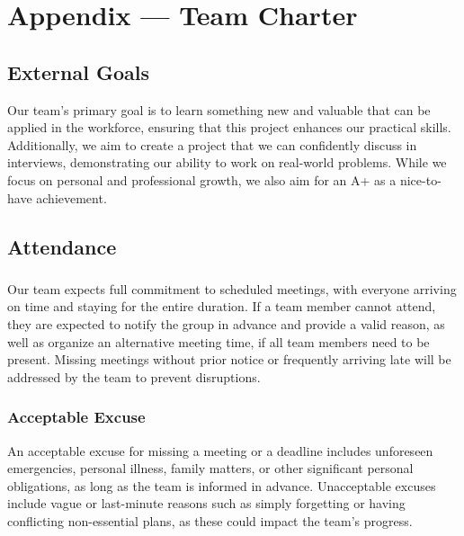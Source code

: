 \documentclass{article}
\begin{document}
\newpage{}

\section*{Appendix --- Team Charter}

\subsection*{External Goals}

Our team's primary goal is to learn something new and valuable that can be applied in the workforce, 
ensuring that this project enhances our practical skills. Additionally, we aim to create a project 
that we can confidently discuss in interviews, demonstrating our ability to work on real-world 
problems. While we focus on personal and professional growth, we also aim for an A+ as a 
nice-to-have achievement.

\subsection*{Attendance}

\subsubsection*{\color{blue}{Expectations}}

Our team expects full commitment to scheduled meetings, with everyone arriving on time and staying 
for the entire duration. If a team member cannot attend, they are expected to notify the group in 
advance and provide a valid reason, as well as organize an alternative meeting time, if all team 
members need to be present. Missing meetings without prior notice or frequently arriving late 
will be addressed by the team to prevent disruptions.

\subsubsection*{\color{blue}Acceptable Excuse}

An acceptable excuse for missing a meeting or a deadline includes unforeseen emergencies, personal 
illness, family matters, or other significant personal obligations, as long as the team is 
informed in advance. Unacceptable excuses include vague or last-minute reasons such as simply 
forgetting or having conflicting non-essential plans, as these could impact the team's progress.
\end{document}
